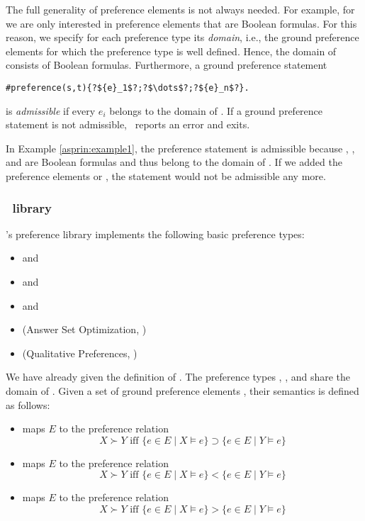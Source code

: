 The full generality of preference elements is not always needed.
For example, for  we are only interested in preference elements that are Boolean formulas.
For this reason, we specify for each preference type its \emph{domain}, 
i.e., the ground preference elements for which the preference type is well defined.
Hence, the domain of  consists of Boolean formulas.
Furthermore, a ground preference statement
\begin{lstlisting}[numbers=none,escapechar=?]
#preference(s,t){?${e}_1$?;?$\dots$?;?${e}_n$?}.
\end{lstlisting}
is \emph{admissible} if every ${e}_i$ belongs to the domain of .
If a ground preference statement is not admissible, \asprin\ reports an error and exits. 
\begin{example}
In Example \ref{asprin:example1}, the preference statement   
is admissible because , , and  are Boolean formulas
and thus belong to the domain of . 
If we added the preference elements  or , 
the statement would not be admissible any more.
\end{example}

\subsubsection{\asprin\ library}

\asprin's preference library implements the following basic preference types:
\begin{itemize}
	\item  {} and    
	\item  {} and    
	\item  {} and    
	\item  {}   (Answer Set Optimization, \cite{brnitr03a})   
	\item  {} (Qualitative Preferences, \cite{rogima10a})  
\end{itemize}

We have already given the definition of . 
The preference types , , and  share the domain of .
Given a set of ground preference elements ,
their semantics is defined as follows:
\begin{itemize}
\item
{} maps $E$ to the preference relation
\[
X \succ Y \text{ iff } \{e\in E\mid X\models e\}\supset\{e\in E\mid Y\models e\}
\]
\item
{} maps $E$ to the preference relation
\[
X \succ Y \text{ iff } \{e\in E\mid X\models e\}<\{e\in E\mid Y\models e\}
\]
\item
{} maps $E$ to the preference relation
\[
X \succ Y \text{ iff } \{e\in E\mid X\models e\}>\{e\in E\mid Y\models e\}
\]
\end{itemize}

